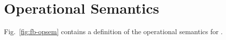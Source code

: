 \section{Operational Semantics}

Fig.~\ref{fig:fb-opsem} contains a definition of the operational semantics for \fbname.



% 
